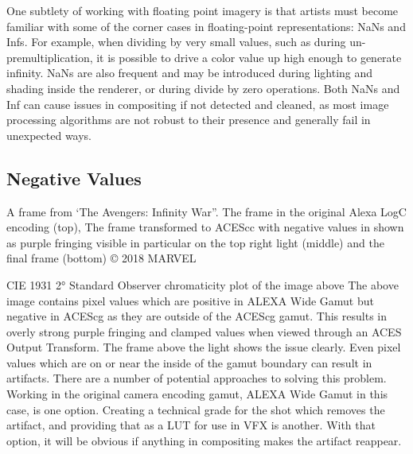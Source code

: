 One subtlety of working with floating point imagery is that artists must become familiar with some of the corner cases in floating-point representations: NaNs and Infs. For example, when dividing by very small values, such as during un-premultiplication, it is possible to drive a color value up high enough to generate infinity. NaNs are also frequent and may be introduced during lighting and shading inside the renderer, or during divide by zero operations. Both NaNs and Inf can cause issues in compositing if not detected and cleaned, as most image processing algorithms are not robust to their presence and generally fail in unexpected ways.

\subsection{Negative Values}



A frame from ‘The Avengers: Infinity War”. The frame in the original Alexa LogC encoding (top), The frame transformed to ACEScc with negative values in shown as purple fringing visible in particular on the top right light (middle) and the final frame (bottom)
© 2018 MARVEL 


CIE 1931 2° Standard Observer chromaticity plot of the image above
The above image contains pixel values which are positive in ALEXA Wide Gamut but negative in ACEScg as they are outside of the ACEScg gamut. This results in overly strong purple fringing and clamped values when viewed through an ACES Output Transform. The frame above the light shows the issue clearly. Even pixel values which are on or near the inside of the gamut boundary can result in artifacts. There are a number of potential approaches to solving this problem. Working in the original camera encoding gamut, ALEXA Wide Gamut in this case, is one option. Creating a technical grade for the shot which removes the artifact, and providing that as a LUT for use in VFX is another. With that option, it will be obvious if anything in compositing makes the artifact reappear.



